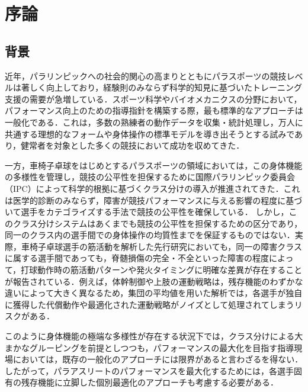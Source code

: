 \documentclass[../main]{subfiles}
\begin{document}
\chapter{序論}
\label{cp:introduction}
\thispagestyle{empty}
\minitoc
\newpage

\section{背景}
\label{sec:intro_background}

近年，パラリンピックへの社会的関心の高まりとともにパラスポーツの競技レベルは著しく向上しており，経験則のみならず科学的知見に基づいたトレーニング支援の需要が急増している．スポーツ科学やバイオメカニクスの分野において，パフォーマンス向上のための指導指針を構築する際，最も標準的なアプローチは一般化である．これは，多数の熟練者の動作データを収集・統計処理し，万人に共通する理想的なフォームや身体操作の標準モデルを導き出そうとする試みであり，健常者を対象とした多くの競技において成功を収めてきた．

一方，車椅子卓球をはじめとするパラスポーツの領域においては，この身体機能の多様性を管理し，競技の公平性を担保するために国際パラリンピック委員会（IPC）によって科学的根拠に基づくクラス分けの導入が推進されてきた．これは医学的診断のみならず，障害が競技パフォーマンスに与える影響の程度に基づいて選手をカテゴライズする手法で競技の公平性を確保している．
しかし，このクラス分けシステムはあくまでも競技の公平性を担保するための区分であり，同一のクラス内の選手間での身体操作の均質性までを保証するものではない．実際，車椅子卓球選手の筋活動を解析した先行研究においても，同一の障害クラスに属する選手間であっても，脊髄損傷の完全・不全といった障害の程度によって，打球動作時の筋活動パターンや発火タイミングに明確な差異が存在することが報告されている．例えば，体幹制御や上肢の運動戦略は，残存機能のわずかな違いによって大きく異なるため，集団の平均値を用いた解析では，各選手が独自に獲得した代償動作や最適化された運動戦略がノイズとして処理されてしまうリスクがある．

このように身体機能の極端な多様性が存在する状況下では，クラス分けによる大まかなグルーピングを前提としつつも，パフォーマンスの最大化を目指す指導現場においては，既存の一般化のアプローチには限界があると言わざるを得ない．したがって，パラアスリートのパフォーマンスを最大化するためには，各選手固有の残存機能に立脚した個別最適化のアプローチも考慮する必要がある．
\end{document}
